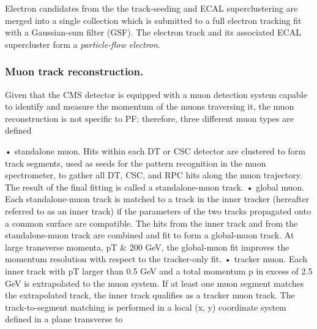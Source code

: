 \noindent Electron candidates from the the track-seeding and  ECAL superclustering are merged into a single collection which is submitted to a full electron tracking fit with a Gaussian-sum filter (GSF)\cite{gsf}. The electron track and its associated ECAL supercluster form a \textit{particle-flow electron}.

\subsubsection*{Muon track reconstruction.}

\noindent Given that the CMS detector is equipped with a muon detection system capable to identify and measure the momentum of the muons traversing it, the muon reconstruction is not specific to PF; therefore, three different muon types are defined





• standalone muon. Hits within each DT or CSC detector are clustered to form track segments,
used as seeds for the pattern recognition in the muon spectrometer, to gather all DT, CSC, and
RPC hits along the muon trajectory. The result of the final fitting is called a standalone-muon
track.
• global muon. Each standalone-muon track is matched to a track in the inner tracker (hereafter
referred to as an inner track) if the parameters of the two tracks propagated onto a common
surface are compatible. The hits from the inner track and from the standalone-muon track are
combined and fit to form a global-muon track. At large transverse momenta, pT \& 200 GeV,
the global-muon fit improves the momentum resolution with respect to the tracker-only fit.
• tracker muon. Each inner track with pT larger than 0.5 GeV and a total momentum p in excess
of 2.5 GeV is extrapolated to the muon system. If at least one muon segment matches the
extrapolated track, the inner track qualifies as a tracker muon track. The track-to-segment
matching is performed in a local (x, y) coordinate system defined in a plane transverse to

